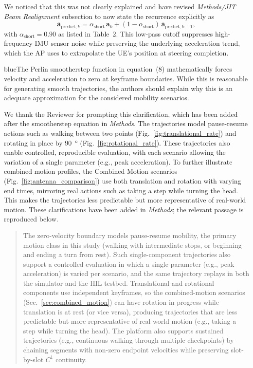 \documentclass{article}
\newcommand{\blue}[1]{\begin{color}{blue}#1\end{color}}
\begin{document}
\noindent We noticed that this was not clearly explained and have revised \emph{Methods/JIT Beam Realignment} subsection to now state the recurrence explicitly as
\begin{equation}
    \bar{\mathbf{a}}_{\text{predict},k} = \alpha_{\text{short}}\, \mathbf{a}_k + (1 - \alpha_{\text{short}})\, \bar{\mathbf{a}}_{\text{predict},k-1},
\end{equation}
with $\alpha_{\text{short}} = 0.90$ as listed in Table~2. This low-pass cutoff suppresses high-frequency IMU sensor noise while preserving the underlying acceleration trend, which the AP uses to extrapolate the UE's position at steering completion.

\begin{tcbremark}
{\selectfont
\blue{The Perlin smootherstep function in equation~(8) mathematically forces velocity and acceleration to zero at keyframe boundaries. While this is reasonable for generating smooth trajectories, the authors should explain why this is an adequate approximation for the considered mobility scenarios.}
}
\end{tcbremark}

\noindent We thank the Reviewer for prompting this clarification, which has been added after the smootherstep equation in \emph{Methods}. The trajectories model pause-resume actions such as walking between two points (Fig.~\ref{fig:translational_rate}) and rotating in place by \SI{90}{\degree} (Fig.~\ref{fig:rotational_rate}). These trajectories also enable controlled, reproducible evaluation, with each scenario allowing the variation of a single parameter (e.g., peak acceleration). To further illustrate combined motion profiles, the Combined Motion scenarios (Fig.~\ref{fig:antenna_comparison}) use both translation and rotation with varying end times, mirroring real actions such as taking a step while turning the head. This makes the trajectories less predictable but more representative of real-world motion. These clarifications have been added in \emph{Methods}; the relevant passage is reproduced below.

\begin{quote}
{\color{cyan!75!black}
The zero-velocity boundary models pause-resume mobility, the primary motion class in this study (walking with intermediate stops, or beginning and ending a turn from rest). Such single-component trajectories also support a controlled evaluation in which a single parameter (e.g., peak acceleration) is varied per scenario, and the same trajectory replays in both the simulator and the HIL testbed. Translational and rotational components use independent keyframes, so the combined-motion scenarios (Sec.~\ref{sec:combined_motion}) can have rotation in progress while translation is at rest (or vice versa), producing trajectories that are less predictable but more representative of real-world motion (e.g., taking a step while turning the head). The platform also supports sustained trajectories (e.g., continuous walking through multiple checkpoints) by chaining segments with non-zero endpoint velocities while preserving slot-by-slot $C^1$ continuity.
}
\end{quote}
\end{document}
